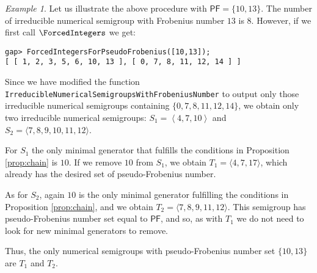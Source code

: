 \documentclass[11pt]{amsart}
\theoremstyle{remark}
\newtheorem{example}[theorem]{Example}
\begin{document}
\begin{example}
Let us illustrate the above procedure with ${\ensuremath{\mathsf{PF}}}=\{10,13\}$. The number of irreducible numerical semigroup with Frobenius number $13$ is $8$. However, if we first call $\ForcedIntegers$ we get:

\begin{verbatim}
gap> ForcedIntegersForPseudoFrobenius([10,13]);
[ [ 1, 2, 3, 5, 6, 10, 13 ], [ 0, 7, 8, 11, 12, 14 ] ]
\end{verbatim}

Since we have modified the function \texttt{IrreducibleNumericalSemigroupsWithFrobeniusNumber} to output only those irreducible numerical semigroups containing $\{0,7,8,11,12,14\}$, we obtain only two irreducible numerical semigroups: $S_1=\left< 4, 7, 10 \right>$ and $S_2=\langle   7, 8, 9, 10, 11, 12 \rangle$.

For $S_1$ the only minimal generator that fulfills the conditions in Proposition \ref{prop:chain} is $10$. If we remove $10$ from $S_1$, we obtain $T_1=\langle 4,7,17\rangle$, which already has the desired set of pseudo-Frobenius number. 

As for $S_2$, again $10$ is the only minimal generator fulfilling the conditions in Proposition \ref{prop:chain}, and we obtain $T_2=\langle 7, 8, 9, 11, 12\rangle$. This semigroup has pseudo-Frobenius number set equal to ${\ensuremath{\mathsf{PF}}}$, and so, as with $T_1$ we do not need to look for new minimal generators to remove.

Thus, the only numerical semigroups with pseudo-Frobenius number set $\{10, 13\}$ are $T_1$ and $T_2$.
\end{example}
\end{document}
